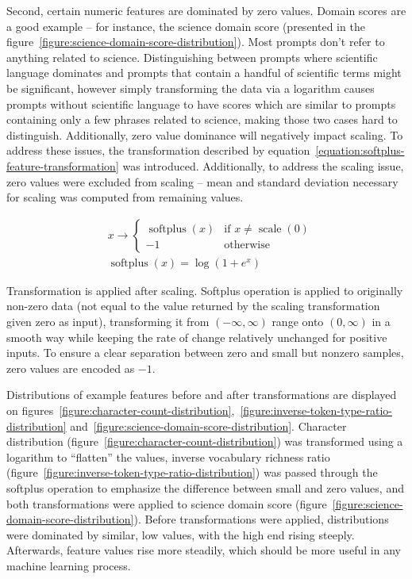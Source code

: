 \documentclass[a4paper,11pt,twoside]{report}
\theoremstyle{definition}
\begin{document}
Second, certain numeric features are dominated by zero values. Domain scores are a good example -- for instance, the science domain score (presented in the figure~\ref{figure:science-domain-score-distribution}). Most prompts don't refer to anything related to science. Distinguishing between prompts where scientific language dominates and prompts that contain a handful of scientific terms might be significant, however simply transforming the data via a logarithm causes prompts without scientific language to have scores which are similar to prompts containing only a few phrases related to science, making those two cases hard to distinguish. Additionally, zero value dominance will negatively impact scaling. To address these issues, the transformation described by equation~\ref{equation:softplus-feature-transformation} was introduced. Additionally, to address the scaling issue, zero values were excluded from scaling -- mean and standard deviation necessary for scaling was computed from remaining values.

\begin{align}
\label{equation:softplus-feature-transformation}
    & x \rightarrow \begin{cases}
        \operatorname{softplus}(x) & \text{if } x \neq \operatorname{scale}(0) \\ 
        -1 & \text{otherwise} 
    \end{cases} \\
    & \operatorname{softplus}(x) = \log(1 + e^x) 
\end{align}

Transformation is applied after scaling. Softplus operation is applied to originally non-zero data (not equal to the value returned by the scaling transformation given zero as input), transforming it from $(-\infty, \infty)$ range onto $(0, \infty)$ in a smooth way while keeping the rate of change relatively unchanged for positive inputs. To ensure a clear separation between zero and small but nonzero samples, zero values are encoded as $-1$.

Distributions of example features before and after transformations are displayed on figures~\ref{figure:character-count-distribution},~\ref{figure:inverse-token-type-ratio-distribution} and~\ref{figure:science-domain-score-distribution}. Character distribution (figure~\ref{figure:character-count-distribution}) was transformed using a logarithm to ``flatten'' the values, inverse vocabulary richness ratio (figure~\ref{figure:inverse-token-type-ratio-distribution}) was passed through the softplus operation to emphasize the difference between small and zero values, and both transformations were applied to science domain score (figure~\ref{figure:science-domain-score-distribution}). Before transformations were applied, distributions were dominated by similar, low values, with the high end rising steeply. Afterwards, feature values rise more steadily, which should be more useful in any machine learning process.
\end{document}
